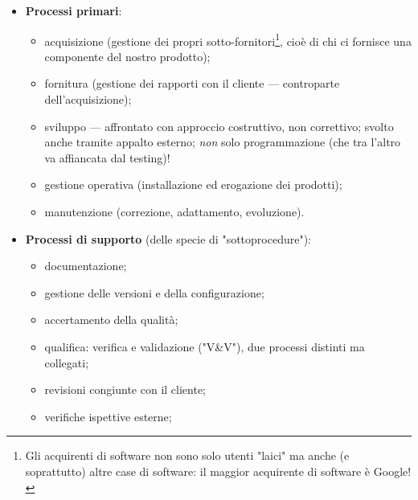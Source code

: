 \documentclass[a4paper]{article}
\begin{document}
	\begin{itemize}
		
			
	\item \textbf{Processi primari}:
				
	\begin{itemize}
		
					
	\item acquisizione (gestione dei propri sotto-fornitori\footnote{Gli acquirenti di software non sono solo utenti "laici" ma anche (e soprattutto) altre case di software: il maggior acquirente di software è Google!}, cioè di chi ci fornisce una componente del nostro prodotto);
					
	\item fornitura (gestione dei rapporti con il cliente --- controparte dell'acquisizione);
					
	\item sviluppo --- affrontato con approccio costruttivo, non correttivo; svolto anche tramite appalto esterno; \emph{non} solo programmazione (che tra l'altro va affiancata dal testing)!
					
	\item gestione operativa (installazione ed erogazione dei prodotti);
					
	\item manutenzione (correzione, adattamento, evoluzione).
				
	\end{itemize}

			
			
	\item \textbf{Processi di supporto} (delle specie di "sottoprocedure"):
				
	\begin{itemize}
		
					
	\item documentazione;
					
	\item gestione delle versioni e della configurazione;
					
	\item accertamento della qualità;
					
	\item qualifica: verifica e validazione ("V\&{}V"), due processi distinti ma collegati;
					
	\item revisioni congiunte con il cliente;
					
	\item verifiche ispettive esterne;
					

\end{itemize}
\end{itemize}
\end{document}
